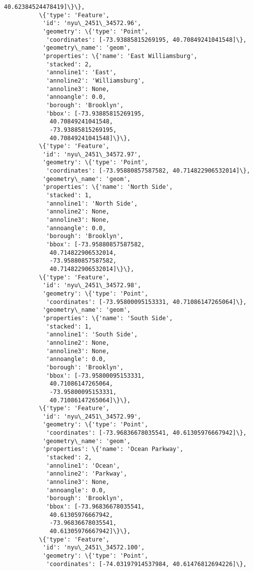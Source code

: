 \documentclass[11pt]{article}
\begin{document}
\begin{Verbatim}[commandchars=\\\{\}]
             40.62384524478419]\}\},
          \{'type': 'Feature',
           'id': 'nyu\_2451\_34572.96',
           'geometry': \{'type': 'Point',
            'coordinates': [-73.93885815269195, 40.70849241041548]\},
           'geometry\_name': 'geom',
           'properties': \{'name': 'East Williamsburg',
            'stacked': 2,
            'annoline1': 'East',
            'annoline2': 'Williamsburg',
            'annoline3': None,
            'annoangle': 0.0,
            'borough': 'Brooklyn',
            'bbox': [-73.93885815269195,
             40.70849241041548,
             -73.93885815269195,
             40.70849241041548]\}\},
          \{'type': 'Feature',
           'id': 'nyu\_2451\_34572.97',
           'geometry': \{'type': 'Point',
            'coordinates': [-73.95880857587582, 40.714822906532014]\},
           'geometry\_name': 'geom',
           'properties': \{'name': 'North Side',
            'stacked': 1,
            'annoline1': 'North Side',
            'annoline2': None,
            'annoline3': None,
            'annoangle': 0.0,
            'borough': 'Brooklyn',
            'bbox': [-73.95880857587582,
             40.714822906532014,
             -73.95880857587582,
             40.714822906532014]\}\},
          \{'type': 'Feature',
           'id': 'nyu\_2451\_34572.98',
           'geometry': \{'type': 'Point',
            'coordinates': [-73.95800095153331, 40.71086147265064]\},
           'geometry\_name': 'geom',
           'properties': \{'name': 'South Side',
            'stacked': 1,
            'annoline1': 'South Side',
            'annoline2': None,
            'annoline3': None,
            'annoangle': 0.0,
            'borough': 'Brooklyn',
            'bbox': [-73.95800095153331,
             40.71086147265064,
             -73.95800095153331,
             40.71086147265064]\}\},
          \{'type': 'Feature',
           'id': 'nyu\_2451\_34572.99',
           'geometry': \{'type': 'Point',
            'coordinates': [-73.96836678035541, 40.61305976667942]\},
           'geometry\_name': 'geom',
           'properties': \{'name': 'Ocean Parkway',
            'stacked': 2,
            'annoline1': 'Ocean',
            'annoline2': 'Parkway',
            'annoline3': None,
            'annoangle': 0.0,
            'borough': 'Brooklyn',
            'bbox': [-73.96836678035541,
             40.61305976667942,
             -73.96836678035541,
             40.61305976667942]\}\},
          \{'type': 'Feature',
           'id': 'nyu\_2451\_34572.100',
           'geometry': \{'type': 'Point',
            'coordinates': [-74.03197914537984, 40.61476812694226]\},

\end{Verbatim}
\end{document}
